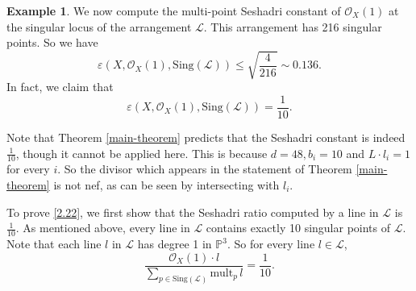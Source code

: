 \documentclass[12pt,reqno]{amsart}
\theoremstyle{plain}
\numberwithin{equation}{section}
\theoremstyle{definition}
\newtheorem{example}[theorem]{Example}
\begin{document}
\begin{example}


		
		We now compute the multi-point Seshadri constant of $\mathcal{O}_X(1)$ at the singular locus of 
		the arrangement $\mathcal{L}$.  This arrangement has 216 singular points. So we have 
		$$\varepsilon(X, \mathcal{O}_X(1), \text{Sing}(\mathcal{L})) \le \sqrt{\frac{4}{216}} \sim 0.136.$$
In fact, we claim that
		\begin{equation}\label{2.22}
		\varepsilon(X, \mathcal{O}_X(1), \text{Sing}(\mathcal{L})) = \frac{1}{10}.
	\end{equation}

Note that Theorem \ref{main-theorem} predicts that the Seshadri constant is indeed $\frac{1}{10}$, though  it cannot be applied here. This is because 
$d=48, b_i = 10$ and $L\cdot l_i = 1$ for every $i$. So the divisor which appears in the statement of Theorem \ref{main-theorem}
is not nef, as can be seen by intersecting with $l_i$. 


  To prove \eqref{2.22}, we first show that the Seshadri ratio computed by a line in $\mathcal{L}$ is $\frac{1}{10}$. 
   As mentioned above, every line in $\mathcal{L}$ contains exactly 10 singular points of $\mathcal{L}$. 
   Note that each line $l$ in $\mathcal{L}$ has degree 1 in $\mathbb{P}^3$.
   So for every line $l \in \mathcal{L}$, 
		\[
		\frac{\mathcal{O}_X(1)\cdot l}{ \sum\limits_{p \in\text{Sing}(\mathcal{L})} \text{mult}_{p} \,l} %
		= \frac{1}{10}.
		\]
  

\end{example}
\end{document}
